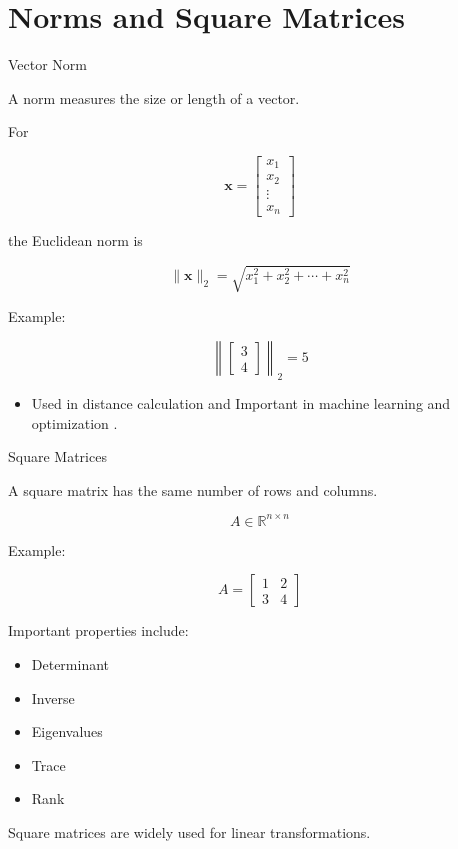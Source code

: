 \documentclass[aspectratio=169]{beamer}
\begin{document}
\section{Norms and Square Matrices}

\begin{frame}{Vector Norm}
\small

A norm measures the size or length of a vector.

For

$$
\mathbf{x}=
\begin{bmatrix}
x_1\\
x_2\\
\vdots\\
x_n
\end{bmatrix}
$$

the Euclidean norm is

$$
\|\mathbf{x}\|_2
=
\sqrt{x_1^2+x_2^2+\cdots+x_n^2}
$$

Example:

$$
\left\|
\begin{bmatrix}
3\\
4
\end{bmatrix}
\right\|_2
=5
$$

\begin{itemize}
\item Used in distance calculation and Important in machine learning and optimization .

\end{itemize}

\end{frame}

\begin{frame}{Square Matrices}
\small

A square matrix has the same number of rows and columns.

$$
A\in\mathbb{R}^{n\times n}
$$

Example:

$$
A=
\begin{bmatrix}
1&2\\
3&4
\end{bmatrix}
$$

Important properties include:

\begin{itemize}
\item Determinant
\item Inverse
\item Eigenvalues
\item Trace
\item Rank
\end{itemize}

Square matrices are widely used for linear transformations.

\end{frame}
\end{document}
